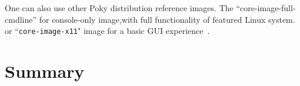 One can also use other Poky distribution reference images. The “core-image-full-cmdline” for console-only image,with full functionality of featured Linux system. or “\texttt{core-image-x11}" image for a basic \ac{GUI} experience~\parencite{veromannembedded}. 
  
\section{Summary}



\clearpage\null\thispagestyle{empty}

